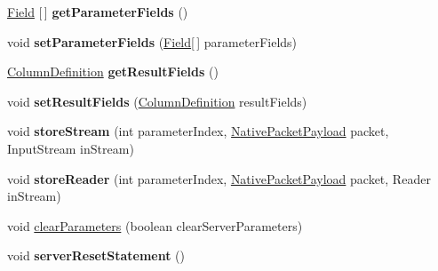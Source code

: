 \begin{DoxyCompactItemize}
\mbox{\label{classcom_1_1mysql_1_1cj_1_1_server_prepared_query_a611aeaa0c2fd7a8b3e49b64d4db7d2f1}} 
\mbox{\hyperlink{classcom_1_1mysql_1_1cj_1_1result_1_1_field}{Field}} \mbox{[}$\,$\mbox{]} {\bfseries get\+Parameter\+Fields} ()
\item 
\mbox{\label{classcom_1_1mysql_1_1cj_1_1_server_prepared_query_ab325a0d325aef0e418802fff21f341af}} 
void {\bfseries set\+Parameter\+Fields} (\mbox{\hyperlink{classcom_1_1mysql_1_1cj_1_1result_1_1_field}{Field}}\mbox{[}$\,$\mbox{]} parameter\+Fields)
\item 
\mbox{\label{classcom_1_1mysql_1_1cj_1_1_server_prepared_query_a969acfe777f6de6a3435912ac0c1f79b}} 
\mbox{\hyperlink{interfacecom_1_1mysql_1_1cj_1_1protocol_1_1_column_definition}{Column\+Definition}} {\bfseries get\+Result\+Fields} ()
\item 
\mbox{\label{classcom_1_1mysql_1_1cj_1_1_server_prepared_query_a6da093a11acf01d2d44e7c248b89de57}} 
void {\bfseries set\+Result\+Fields} (\mbox{\hyperlink{interfacecom_1_1mysql_1_1cj_1_1protocol_1_1_column_definition}{Column\+Definition}} result\+Fields)
\item 
\mbox{\label{classcom_1_1mysql_1_1cj_1_1_server_prepared_query_a056104958d556f856c15308012eae077}} 
void {\bfseries store\+Stream} (int parameter\+Index, \mbox{\hyperlink{classcom_1_1mysql_1_1cj_1_1protocol_1_1a_1_1_native_packet_payload}{Native\+Packet\+Payload}} packet, Input\+Stream in\+Stream)
\item 
\mbox{\label{classcom_1_1mysql_1_1cj_1_1_server_prepared_query_ac4ac18fbd9ce15ea67cb5bb4a04bf420}} 
void {\bfseries store\+Reader} (int parameter\+Index, \mbox{\hyperlink{classcom_1_1mysql_1_1cj_1_1protocol_1_1a_1_1_native_packet_payload}{Native\+Packet\+Payload}} packet, Reader in\+Stream)
\item 
void \mbox{\hyperlink{classcom_1_1mysql_1_1cj_1_1_server_prepared_query_aa5d47640d47bde9fff14feaaf1ad2bf1}{clear\+Parameters}} (boolean clear\+Server\+Parameters)
\item 
\mbox{\label{classcom_1_1mysql_1_1cj_1_1_server_prepared_query_ac8db9431d10351f9ad35cac48cb57a5b}} 
void {\bfseries server\+Reset\+Statement} ()
\end{DoxyCompactItemize}
